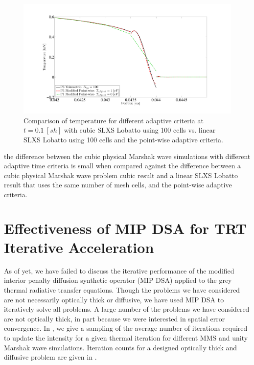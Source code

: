 \begin{figure}[!htp]
\centering
\includegraphics[width=16cm,trim=2in  0.4in 0.5in 0.75in,clip=true]{chapter6_grey_radtran/Dissertation_Data/P3_P1_100C_vs_Physical_Marshak_Wave_Temperature_Comparison_Final_Zoom.pdf}
\caption{Comparison of temperature for different adaptive criteria at $t=0.1~[sh]$ with cubic SLXS Lobatto using 100 cells vs. linear SLXS Lobatto using 100 cells and the point-wise adaptive criteria.}
\label{fig:time_difference_temperature_zoom}
\end{figure}
the difference between the cubic physical Marshak wave simulations with different adaptive time criteria is small when compared against the difference between a cubic physical Marshak wave problem cubic result and a linear SLXS Lobatto result that uses the same number of mesh cells, and the point-wise adaptive criteria.

\newpage

\section{Effectiveness of MIP DSA for TRT Iterative Acceleration}
\label{sec:mip_results}

As of yet, we have failed to discuss the iterative performance of the modified interior penalty diffusion synthetic operator (MIP DSA) applied to the grey thermal radiative transfer equations.
Though the problems we have considered are not necessarily optically thick or diffusive, we have used MIP DSA to iteratively solve all problems.
A large number of the problems we have considered are not optically thick, in part because we were interested in spatial error convergence.
In , we give a sampling of the average number of iterations required to update the intensity for a given thermal iteration for different MMS and unity Marshak wave simulations.
Iteration counts for a designed optically thick and diffusive problem are given in .


